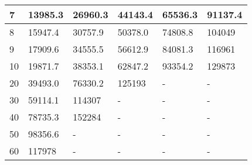 \begin{table}[h]
\begin{tabular}{|l|l|l|l|l|l|}
7                                                                          & 13985.3                              & 26960.3                               & 44143.4                               & 65536.3                               & 91137.4                               \\ \hline
8                                                                          & 15947.4                              & 30757.9                               & 50378.0                               & 74808.8                               & 104049                                \\ \hline
9                                                                          & 17909.6                              & 34555.5                               & 56612.9                               & 84081.3                               & 116961                                \\ \hline
10                                                                         & 19871.7                              & 38353.1                               & 62847.2                               & 93354.2                               & 129873                                \\ \hline
20                                                                         & 39493.0                              & 76330.2                               & 125193                                & -                                     & -                                     \\ \hline
30                                                                         & 59114.1                              & 114307                                & -                                     & -                                     & -                                     \\ \hline
40                                                                         & 78735.3                              & 152284                                & -                                     & -                                     & -                                     \\ \hline
50                                                                         & 98356.6                              & -                                     & -                                     & -                                     & -                                     \\ \hline
60                                                                         & 117978                               & -                                     & -                                     & -                                     & -                                     \\ \hline

\end{tabular}
\end{table}
